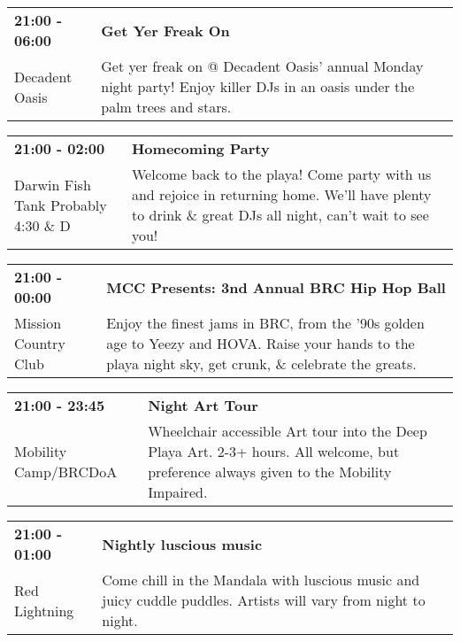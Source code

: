 \begin{tabular}{ p{1in} p{2.2in} }
    \textbf{21:00 - 06:00} & \textbf{Get Yer Freak On} \\
    Decadent Oasis \newline  & Get yer freak on @ Decadent Oasis' annual Monday night party!  Enjoy killer DJs in an oasis under the palm trees and stars. \\
    \hline 
\end{tabular}
    
\begin{tabular}{ p{1in} p{2.2in} }
    \textbf{21:00 - 02:00} & \textbf{Homecoming Party} \\
    Darwin Fish Tank \newline Probably 4:30 \& D & Welcome back to the playa! Come party with us and rejoice in returning home.  We'll have plenty to drink \& great DJs all night, can't wait to see you! \\
    \hline 
\end{tabular}
    
\begin{tabular}{ p{1in} p{2.2in} }
    \textbf{21:00 - 00:00} & \textbf{MCC Presents: 3nd Annual BRC Hip Hop Ball} \\
    Mission Country Club \newline  & Enjoy the finest jams in BRC, from the '90s golden age to Yeezy and HOVA. Raise your hands to the playa night sky, get crunk, \& celebrate the greats. \\
    \hline 
\end{tabular}
    
\begin{tabular}{ p{1in} p{2.2in} }
    \textbf{21:00 - 23:45} & \textbf{Night Art Tour} \\
    Mobility Camp/BRCDoA \newline  & Wheelchair accessible Art tour into the Deep Playa Art.
2-3+ hours. All welcome, but preference always given to the Mobility Impaired. \\
    \hline 
\end{tabular}
    
\begin{tabular}{ p{1in} p{2.2in} }
    \textbf{21:00 - 01:00} & \textbf{Nightly luscious music} \\
    Red Lightning \newline  & Come chill in the Mandala with luscious music and juicy cuddle puddles. Artists will vary from night to night. \\
    \hline 
\end{tabular}
    
